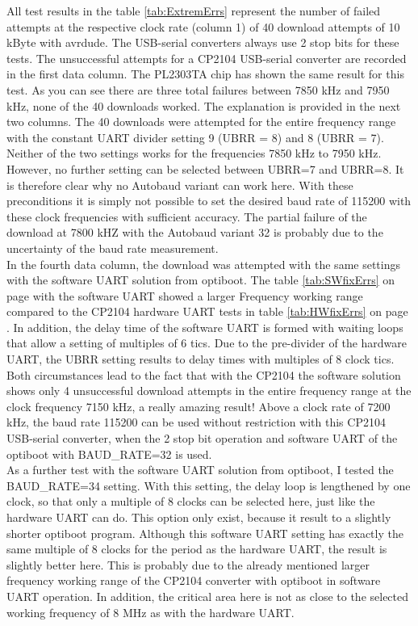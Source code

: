 All test results in the table \ref{tab:ExtremErrs} represent the number of failed attempts at the
respective clock rate (column 1) of 40 download attempts of 10 kByte with avrdude.
The USB-serial converters always use 2 stop bits for these tests.
The unsuccessful attempts for a CP2104 USB-serial converter are recorded in the first data column.
The PL2303TA chip has shown the same result for this test.
As you can see there are three total failures between 7850 kHz and 7950 kHz,
none of the 40 downloads worked.
The explanation is provided in the next two columns.
The 40 downloads were attempted for the entire frequency range with the constant UART
divider setting 9 (UBRR = 8) and 8 (UBRR = 7).
Neither of the two settings works for the frequencies 7850 kHz to 7950 kHz.
However, no further setting can be selected between UBRR=7 and UBRR=8.
It is therefore clear why no Autobaud variant can work here.
With these preconditions it is simply not possible to set the desired baud rate of 115200
with these clock frequencies with sufficient accuracy.
The partial failure of the download at 7800 kHZ with the Autobaud variant 32
is probably due to the uncertainty of the baud rate measurement.\\

In the fourth data column, the download was attempted with the same settings with the software UART solution from optiboot.
The table \ref{tab:SWfixErrs} on page \pageref{tab:SWfixErrs} with the software UART showed a larger 
Frequency working range compared to the CP2104 hardware UART tests in table \ref{tab:HWfixErrs} on page \pageref{tab:HWfixErrs}.
In addition, the delay time of the software UART is formed with waiting loops that allow a setting of multiples of 6 tics.
Due to the pre-divider of the hardware UART, the UBRR setting results to delay times with multiples of 8 clock tics.
Both circumstances lead to the fact that with the CP2104 the software solution shows only 4 unsuccessful download attempts
in the entire frequency range at the clock frequency 7150 kHz, a really amazing result!
Above a clock rate of 7200 kHz, the baud rate 115200 can be used without restriction with this CP2104 USB-serial converter,
when the 2 stop bit operation and software UART of the optiboot with BAUD\_RATE=32 is used.\\

As a further test with the software UART solution from optiboot, I tested the BAUD\_RATE=34 setting.
With this setting, the delay loop is lengthened by one clock, so that only a multiple of 8 clocks can be selected here,
just like the hardware UART can do.
This option only exist, because it result to a slightly shorter optiboot program.
Although this software UART setting has exactly the same multiple of 8 clocks for the period as the hardware UART,
the result is slightly better here.
This is probably due to the already mentioned larger frequency working range of the CP2104 converter
with optiboot in software UART operation.
In addition, the critical area here is not as close to the selected working frequency of 8 MHz as with the hardware UART.\\

